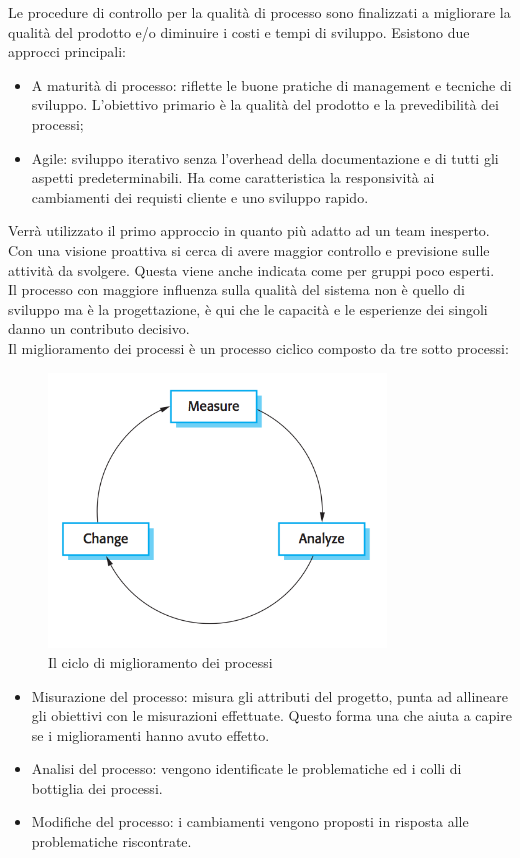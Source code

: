 	Le procedure di controllo per la qualità di processo sono finalizzati a migliorare la qualità del prodotto e/o diminuire i costi e tempi di sviluppo. Esistono due approcci principali:
	\begin{itemize}
		\item A maturità di processo: riflette le buone pratiche di management e tecniche di sviluppo. L'obiettivo primario è la qualità del prodotto e la prevedibilità dei processi;
		\item Agile: sviluppo iterativo senza l'overhead della documentazione e di tutti gli aspetti predeterminabili. Ha come caratteristica la responsività ai cambiamenti dei requisti cliente e uno sviluppo rapido.
	\end{itemize}

	Verrà utilizzato il primo approccio in quanto più adatto ad un team inesperto. Con una visione proattiva si cerca di avere maggior controllo e previsione sulle attività da svolgere. Questa viene anche indicata come  per gruppi poco esperti.\\
	Il processo con maggiore influenza sulla qualità del sistema non è quello di sviluppo ma è la progettazione, è qui che le capacità e le esperienze dei singoli danno un contributo decisivo.\\
	Il miglioramento dei processi è un processo ciclico composto da tre sotto processi:
	
	\begin{figure}[h]
	\centering \includegraphics[width=0.8\textwidth]{ProcessImprovementCycle.png}
	\caption{Il ciclo di miglioramento dei processi}
	\end{figure}

	\begin{itemize}
		\item Misurazione del processo: misura gli attributi del progetto, punta ad allineare gli obiettivi con le misurazioni effettuate. Questo forma una  che aiuta a capire se i miglioramenti hanno avuto effetto.
		\item Analisi del processo: vengono identificate le problematiche ed i colli di bottiglia dei processi.
		\item Modifiche del processo: i cambiamenti vengono proposti in risposta alle problematiche riscontrate.
	\end{itemize}
	
